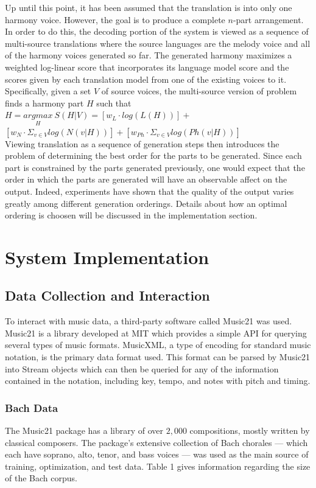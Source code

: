 \documentclass{sig-alternate}
\begin{document}
Up until this point, it has been assumed that the translation is into only one harmony voice. However, the goal is to produce a complete $n$-part arrangement. In order to do this, the decoding portion of the system is viewed as a sequence of multi-source translations where the source languages are the melody voice and all of the harmony voices generated so far. The generated harmony maximizes a weighted log-linear score that incorporates its language model score and the scores given by each translation model from one of the existing voices to it. Specifically, given a set $V$ of source voices, the multi-source version of problem finds a harmony part $H$ such that\\

$H = \underset{H}{argmax}\ S(H | V) = [w_{L}\cdot log(L(H))] + $\\

$[w_{N}\cdot \Sigma_{v \in V} log(N(v | H))] + [w_{Ph}\cdot \Sigma_{v \in V} log(Ph(v | H))]$\\

Viewing translation as a sequence of generation steps then introduces the problem of determining the best order for the parts to be generated. Since each part is constrained by the parts generated previously, one would expect that the order in which the parts are generated will have an observable affect on the output. Indeed,  experiments have shown that the quality of the output varies greatly among different generation orderings. Details about how an optimal ordering is choosen will be discussed in the implementation section.

\section{System Implementation}
\label{sec:sys_implement}
\subsection{Data Collection and Interaction}
To interact with music data, a third-party software called Music21\cite{Cuthbert_music21:a} was used. Music21 is a library developed at MIT which provides a simple API for querying several types of music formats.  MusicXML, a type of encoding for standard music notation, is the primary data format used. This format can be parsed by Music21 into Stream objects which can then be queried for any of the information contained in the notation, including key, tempo, and notes with pitch and timing. 
\subsubsection{Bach Data}
The Music21 package has a library of over $2,000$ compositions, mostly written by classical composers. The package's extensive collection of Bach chorales --- which each have soprano, alto, tenor, and bass voices --- was used as the main source of training, optimization, and test data. Table 1 gives information regarding the size of the Bach corpus.
\end{document}
